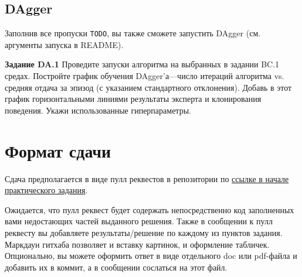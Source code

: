 \documentclass[12pt, oneside]{article}
\begin{document}
\subsection{DAgger}

Заполнив все пропуски \verb|TODO|, вы также сможете запустить DAgger (см. аргументы запуска в README).

\textbf{Задание DA.1} Проведите запуски алгоритма на выбранных в задании BC.1 средах. Постройте график обучения DAgger'а---число итераций алгоритма vs. средняя отдача за эпизод (с указанием стандартного отклонения). Добавь в этот график горизонтальными линиями результаты эксперта и клонирования поведения. Укажи использованные гиперпараметры.

\section{Формат сдачи}

Сдача предполагается в виде пулл реквестов в репозитории по \href{https://github.com/pkuderov/mipt-rl-hw-2022}{ссылке в начале практического задания}.

Ожидается, что пулл реквест будет содержать непосредственно код заполненных вами недостающих частей выданного решения. Также в сообщении к пулл реквесту вы добавляете результаты/решение по каждому из пунктов задания. Маркдаун гитхаба позволяет и вставку картинок, и оформление табличек. Опционально, вы можете оформить ответ в виде отдельного doc или pdf-файла и добавить их в коммит, а в сообщении сослаться на этот файл.
\end{document}
